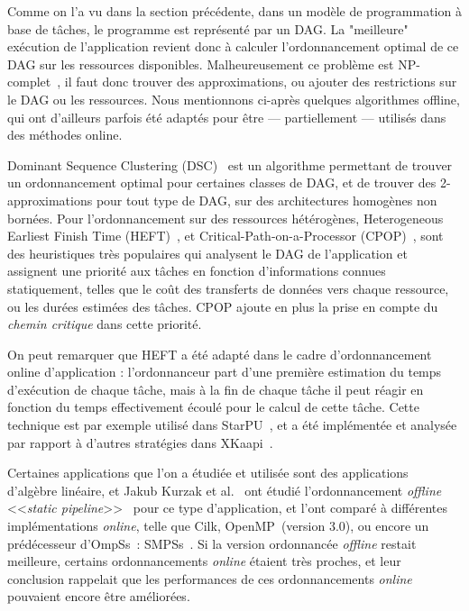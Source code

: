 Comme on l'a vu dans la section précédente, dans un modèle de programmation à base de tâches, le programme est représenté par un DAG.
La "meilleure" exécution de l'application revient donc à calculer l'ordonnancement optimal de ce DAG sur les ressources disponibles.
Malheureusement ce problème est NP-complet~\cite{Cook1971}, il faut donc trouver des approximations, ou ajouter des restrictions sur le DAG ou les ressources.
Nous mentionnons ci-après quelques algorithmes offline, qui ont d'ailleurs parfois été adaptés pour être --- partiellement --- utilisés dans des méthodes online.

Dominant Sequence Clustering (DSC)~\cite{Yang1994} est un algorithme permettant de trouver un ordonnancement optimal pour certaines classes de DAG, et de trouver des 2-approximations pour tout type de DAG, sur des architectures homogènes non bornées.
Pour l'ordonnancement sur des ressources hétérogènes, Heterogeneous Earliest Finish Time (HEFT)~\cite{HEFT}, et Critical-Path-on-a-Processor (CPOP)~\cite{HEFT}, sont des heuristiques très populaires qui analysent le DAG de l'application et assignent une priorité aux tâches en fonction d'informations connues statiquement, telles que le coût des transferts de données vers chaque ressource, ou les durées estimées des tâches.
CPOP ajoute en plus la prise en compte du \emph{chemin critique} dans cette priorité.

On peut remarquer que HEFT a été adapté dans le cadre d'ordonnancement online d'application : l'ordonnanceur part d'une première estimation du temps d'exécution de chaque tâche, mais à la fin de chaque tâche il peut réagir en fonction du temps effectivement écoulé pour le calcul de cette tâche. Cette technique est par exemple utilisé dans StarPU~\cite{StarPU}, et a été implémentée et analysée par rapport à d'autres stratégies dans XKaapi~\cite{Lima2015}.

Certaines applications que l'on a étudiée et utilisée sont des applications d'algèbre linéaire, et Jakub Kurzak et al.~\cite{Kurzak2010} ont étudié l'ordonnancement \emph{offline} <<\emph{static pipeline}>>~\cite{Kurzak2008, Kurzak2009} pour ce type d'application, et l'ont comparé à différentes implémentations \emph{online}, telle que Cilk, OpenMP~(version 3.0), ou encore un prédécesseur d'OmpSs~: SMPSs~\cite{BSC2008}.
Si la version ordonnancée \emph{offline} restait meilleure, certains ordonnancements \emph{online} étaient très proches, et leur conclusion rappelait que les performances de ces ordonnancements \emph{online} pouvaient encore être améliorées.



